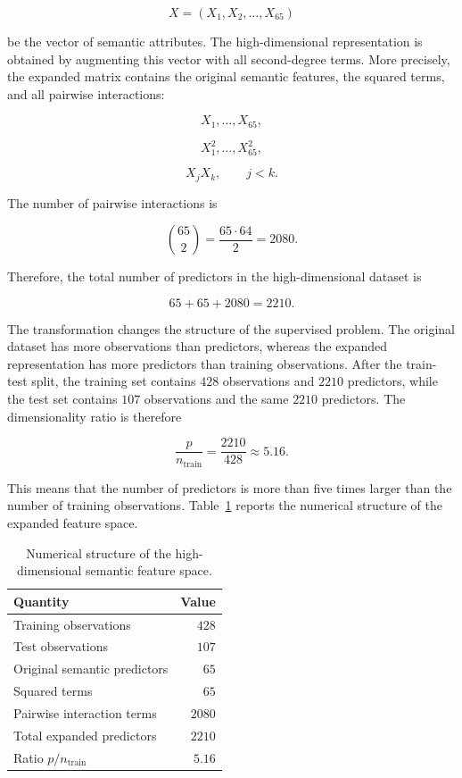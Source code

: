 \documentclass{ipgpmaster}
\begin{document}
\[
X = (X_1, X_2, \ldots, X_{65})
\]

be the vector of semantic attributes. The high-dimensional representation is obtained by augmenting this vector with all second-degree terms. More precisely, the expanded matrix contains the original semantic features, the squared terms, and all pairwise interactions:

\[
X_1,\ldots,X_{65},
\]

\[
X_1^2,\ldots,X_{65}^2,
\]

\[
X_jX_k, \qquad j<k.
\]

The number of pairwise interactions is

\[
\binom{65}{2}
=
\frac{65 \cdot 64}{2}
=
2080.
\]

Therefore, the total number of predictors in the high-dimensional dataset is

\[
65 + 65 + 2080 = 2210.
\]

The transformation changes the structure of the supervised problem. The original dataset has more observations than predictors, whereas the expanded representation has more predictors than training observations. After the train-test split, the training set contains \(428\) observations and \(2210\) predictors, while the test set contains \(107\) observations and the same \(2210\) predictors. The dimensionality ratio is therefore

\[
\frac{p}{n_{\text{train}}}
=
\frac{2210}{428}
\approx 5.16.
\]

This means that the number of predictors is more than five times larger than the number of training observations. Table~\ref{tab:hd-expansion-summary} reports the numerical structure of the expanded feature space.

\begin{table}[H]
\centering
\begin{tabular}{lr}
\hline
\textbf{Quantity} & \textbf{Value} \\
\hline
Training observations & \(428\) \\
Test observations & \(107\) \\
Original semantic predictors & \(65\) \\
Squared terms & \(65\) \\
Pairwise interaction terms & \(2080\) \\
Total expanded predictors & \(2210\) \\
Ratio \(p/n_{\text{train}}\) & \(5.16\) \\
\hline
\end{tabular}
\caption{Numerical structure of the high-dimensional semantic feature space.}
\label{tab:hd-expansion-summary}
\end{table}
\end{document}
